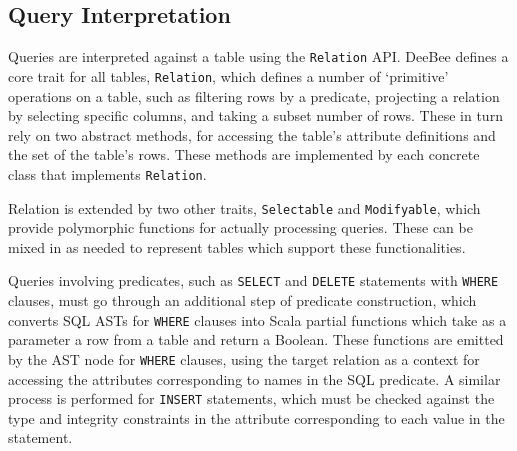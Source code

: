 \subsection{Query Interpretation}
\label{sec:query}
Queries are interpreted against a table using the \texttt{Relation} API. DeeBee defines a core trait for all tables, \texttt{Relation}, which defines a number of `primitive' operations on a table, such as filtering rows by a predicate, projecting a relation by selecting specific columns, and taking a subset number of rows. These in turn rely on two abstract methods, for accessing the table's attribute definitions and the set of the table's rows. These methods are implemented by each concrete class that implements \texttt{Relation}.

Relation is extended by two other traits, \texttt{Selectable} and \texttt{Modifyable}, which provide polymorphic functions for actually processing queries. These can be mixed in as needed to represent tables which support these functionalities.

Queries involving predicates, such as \texttt{SELECT} and \texttt{DELETE} statements with \texttt{WHERE} clauses, must go through an additional step of predicate construction, which converts SQL ASTs for \texttt{WHERE} clauses into Scala partial functions which take as a parameter a row from a table and return a Boolean. These functions are emitted by the AST node for \texttt{WHERE} clauses, using the target relation as a context for accessing the attributes corresponding to names in the SQL predicate. A similar process is performed for \texttt{INSERT} statements, which must be checked against the type and integrity constraints in the attribute corresponding to each value in the statement.


